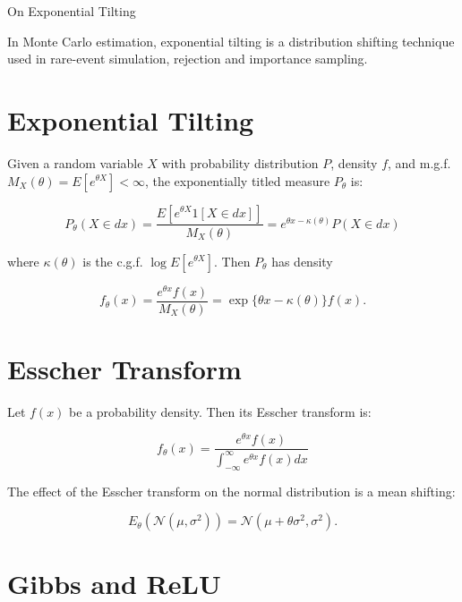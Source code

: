 \documentclass[11pt]{article}
\begin{document}
	
\begin{center}
{\LARGE On Exponential Tilting} 
\end{center}

In Monte Carlo estimation, exponential tilting is a distribution shifting technique used in rare-event simulation, rejection and importance sampling.

\section{Exponential Tilting}

Given a random variable $X$ with probability distribution $P$, density $f$, and m.g.f. $M_X(\theta) = E[e^{\theta X}] < \infty$, the exponentially titled measure $P_\theta$ is:

\begin{equation}
P_\theta(X \in dx) = \frac{E[e^{\theta X}1[X\in dx]]}{M_X (\theta)} = e^{\theta x - \kappa(\theta)} P(X \in dx)
\end{equation}

where $\kappa(\theta)$ is the c.g.f. $\log E[e^{\theta X}]$. Then $P_\theta$ has density

\begin{equation}
f_\theta(x) = \frac{e^{\theta x}f(x)}{M_X(\theta)}=\exp\{\theta x - \kappa(\theta) \}f(x).
\end{equation}

\section{Esscher Transform}

Let $f(x)$ be a probability density. Then its Esscher transform is:

\begin{equation}
f_\theta(x) = \frac{ e^{\theta x}f(x) }{ \int_{-\infty}^{\infty} e^{\theta x}f(x)dx }
\end{equation}

The effect of the Esscher transform on the normal distribution is a mean shifting:

\begin{equation}
E_\theta(\mathcal{N}(\mu,\sigma^2)) = \mathcal{N}(\mu+\theta\sigma^2,\sigma^2).
\end{equation}

\section{Gibbs and ReLU}
\end{document}

